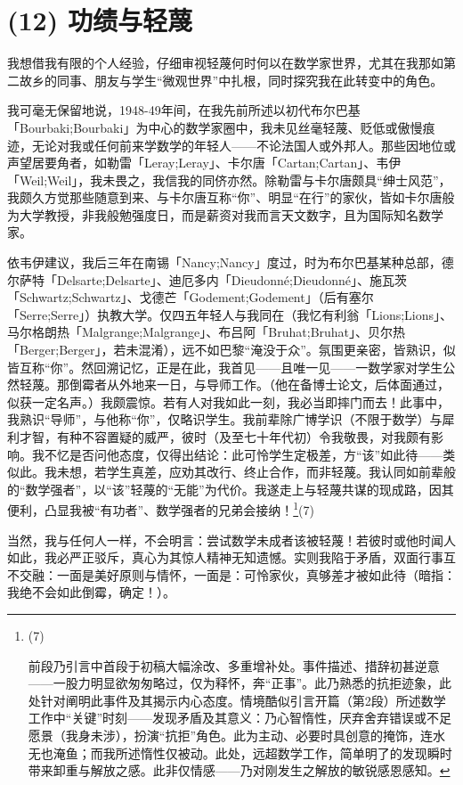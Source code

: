 \section{(12) 功绩与轻蔑}

我想借我有限的个人经验，仔细审视轻蔑何时何以在数学家世界，尤其在我那如第二故乡的同事、朋友与学生“微观世界”中扎根，同时探究我在此转变中的角色。

我可毫无保留地说，1948-49年间，在我先前所述以初代布尔巴基「Bourbaki;Bourbaki」为中心的数学家圈中，我未见丝毫轻蔑、贬低或傲慢痕迹，无论对我或任何前来学数学的年轻人——不论法国人或外邦人。那些因地位或声望居要角者，如勒雷「Leray;Leray」、卡尔唐「Cartan;Cartan」、韦伊「Weil;Weil」，我未畏之，我信我的同侪亦然。除勒雷与卡尔唐颇具“绅士风范”，我颇久方觉那些随意到来、与卡尔唐互称“你”、明显“在行”的家伙，皆如卡尔唐般为大学教授，非我般勉强度日，而是薪资对我而言天文数字，且为国际知名数学家。

依韦伊建议，我后三年在南锡「Nancy;Nancy」度过，时为布尔巴基某种总部，德尔萨特「Delsarte;Delsarte」、迪厄多内「Dieudonné;Dieudonné」、施瓦茨「Schwartz;Schwartz」、戈德芒「Godement;Godement」（后有塞尔「Serre;Serre」）执教大学。仅四五年轻人与我同在（我忆有利翁「Lions;Lions」、马尔格朗热「Malgrange;Malgrange」、布吕阿「Bruhat;Bruhat」、贝尔热「Berger;Berger」，若未混淆），远不如巴黎“淹没于众”。氛围更亲密，皆熟识，似皆互称“你”。然回溯记忆，正是在此，我首见——且唯一见——一数学家对学生公然轻蔑。那倒霉者从外地来一日，与导师工作。（他在备博士论文，后体面通过，似获一定名声。）我颇震惊。若有人对我如此一刻，我必当即摔门而去！此事中，我熟识“导师”，与他称“你”，仅略识学生。我前辈除广博学识（不限于数学）与犀利才智，有种不容置疑的威严，彼时（及至七十年代初）令我敬畏，对我颇有影响。我不忆是否问他态度，仅得出结论：此可怜学生定极差，方“该”如此待——类似此。我未想，若学生真差，应劝其改行、终止合作，而非轻蔑。我认同如前辈般的“数学强者”，以“该”轻蔑的“无能”为代价。我遂走上与轻蔑共谋的现成路，因其便利，凸显我被“有功者”、数学强者的兄弟会接纳！\footnote{(7)\par 前段乃引言中首段于初稿大幅涂改、多重增补处。事件描述、措辞初甚逆意——一股力明显欲匆匆略过，仅为释怀，奔“正事”。此乃熟悉的抗拒迹象，此处针对阐明此事件及其揭示内心态度。情境酷似引言开篇（第2段）所述数学工作中“关键”时刻——发现矛盾及其意义：乃心智惰性，厌弃舍弃错误或不足愿景（我身未涉），扮演“抗拒”角色。此为主动、必要时具创意的掩饰，连水无也淹鱼；而我所述惰性仅被动。此处，远超数学工作，简单明了的发现瞬时带来卸重与解放之感。此非仅情感——乃对刚发生之解放的敏锐感恩感知。}(7)

当然，我与任何人一样，不会明言：尝试数学未成者该被轻蔑！若彼时或他时闻人如此，我必严正驳斥，真心为其惊人精神无知遗憾。实则我陷于矛盾，双面行事互不交融：一面是美好原则与情怀，一面是：可怜家伙，真够差才被如此待（暗指：我绝不会如此倒霉，确定！）。

